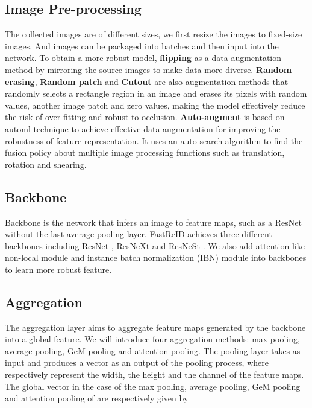 \documentclass[10pt,twocolumn,letterpaper]{article}
\begin{document}
\subsection{Image Pre-processing}
The collected images are of different sizes, we first resize the images to fixed-size images. And images can be packaged into batches and then input into the network. To obtain a more robust model, \textbf{flipping} as a data augmentation method by mirroring the source images to make data more diverse.  \textbf{Random erasing}, \textbf{Random patch} \cite{Zhou_2019_ICCV} and \noindent\textbf{Cutout} \cite{devries2017improved} are also augmentation methods that randomly selects a rectangle region in an image and erases its pixels with random values, another image patch and zero values, making the model effectively reduce the risk of over-fitting and robust to occlusion. \noindent\textbf{Auto-augment} is based on automl technique to achieve effective data augmentation for improving the robustness of feature representation. It uses an auto search algorithm to find the fusion policy about multiple image processing functions such as translation, rotation and shearing.


\subsection{Backbone}
Backbone is the network that infers an image to feature maps, such as a ResNet without the last average pooling layer. FastReID achieves three different backbones including ResNet \cite{he2016deep}, ResNeXt \cite{xie2017aggregated} and ResNeSt \cite{zhang2020resnest}. We also add attention-like non-local \cite{wang2018non} module and instance batch normalization (IBN) \cite{pan2018two} module into backbones to learn more robust feature. 

\subsection{Aggregation}
The aggregation layer aims to aggregate feature maps generated by the backbone into a global feature. We will introduce four aggregation methods: max pooling, average pooling, GeM pooling and attention pooling. The pooling layer takes  as input and produces a vector  as an output of the pooling process, where  respectively represent the width, the height and the channel of the feature maps. The global vector  in the case of the max pooling, average pooling, GeM pooling and attention pooling of are respectively given by 
\end{document}
